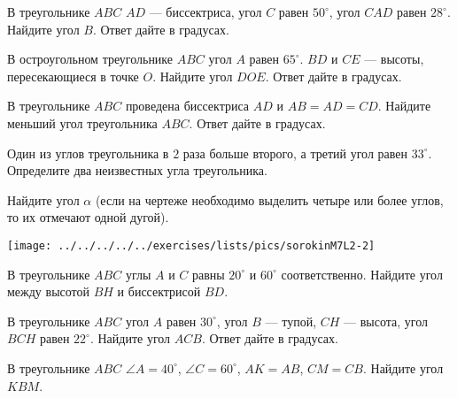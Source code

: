 %
%

\begin{class}[number=1]
	\begin{listofex}
		\item В треугольнике \( ABC \) \( AD \)  — биссектриса, угол \( C \) равен \( 50^{\circ} \), угол \( CAD \) равен \( 28^{\circ} \). Найдите угол \( B \). Ответ дайте в градусах.
		\item В остроугольном треугольнике \( ABC \) угол \( A \) равен \( 65^{\circ} \). \( BD \) и \( CE \)  — высоты, пересекающиеся в точке \( O \). Найдите угол \( DOE \). Ответ дайте в градусах.
		\item В треугольнике \( ABC \) проведена биссектриса \( AD \) и \( AB = AD = CD \). Найдите меньший угол треугольника \( ABC \). Ответ дайте в градусах.
		\item Один из углов треугольника в \( 2 \) раза больше второго, а третий угол равен \(  33^{\circ} \). Определите два неизвестных угла треугольника.
		\item
		\begin{minipage}[t]{\bodywidth}
			Найдите угол \( \alpha \) (если на чертеже необходимо выделить четыре или более углов, то их отмечают одной дугой).
		\end{minipage}
		\hspace{0.02\linewidth}
		\begin{minipage}[t]{\picwidth}
			\texttt{[image: ../../../../../exercises/lists/pics/sorokinM7L2-2]}
		\end{minipage}
		\item В треугольнике \( ABC \) углы \( A \) и \( C \) равны \( 20^{\circ } \) и \( 60^{\circ} \) соответственно. Найдите угол между высотой \( BH \) и биссектрисой \( BD \). 
		\item В треугольнике \( ABC \) угол \( A \) равен \( 30^{\circ} \), угол \( B \)  — тупой, \( CH \)  — высота, угол \( BCH  \) равен \( 22^{\circ} \). Найдите угол \( ACB \). Ответ дайте в градусах.
		\item 
		\begin{minipage}[t]{\bodywidth}
			В треугольнике \( ABC \) \( \angle A = 40^{\circ} \), \( 
			\angle C = 60^{\circ} \), \( AK = AB \), \( CM = CB \). Найдите угол \( KBM \).
		\end{minipage}
		\hspace{0.02\linewidth}
		\begin{minipage}[t]{\picwidth}

\end{minipage}
\end{listofex}
\end{class}
